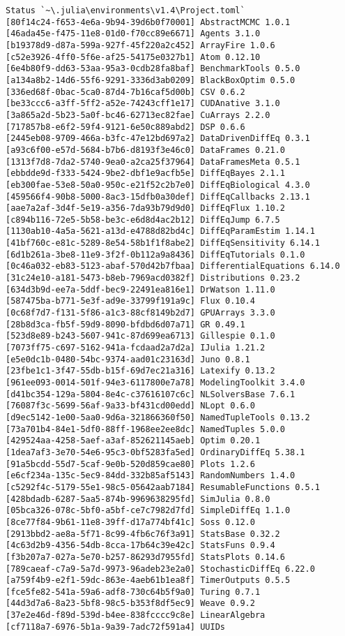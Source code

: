 \documentclass[12pt,a4paper]{article}
\begin{document}
\begin{verbatim}
Status `~\.julia\environments\v1.4\Project.toml`
[80f14c24-f653-4e6a-9b94-39d6b0f70001] AbstractMCMC 1.0.1
[46ada45e-f475-11e8-01d0-f70cc89e6671] Agents 3.1.0
[b19378d9-d87a-599a-927f-45f220a2c452] ArrayFire 1.0.6
[c52e3926-4ff0-5f6e-af25-54175e0327b1] Atom 0.12.10
[6e4b80f9-dd63-53aa-95a3-0cdb28fa8baf] BenchmarkTools 0.5.0
[a134a8b2-14d6-55f6-9291-3336d3ab0209] BlackBoxOptim 0.5.0
[336ed68f-0bac-5ca0-87d4-7b16caf5d00b] CSV 0.6.2
[be33ccc6-a3ff-5ff2-a52e-74243cff1e17] CUDAnative 3.1.0
[3a865a2d-5b23-5a0f-bc46-62713ec82fae] CuArrays 2.2.0
[717857b8-e6f2-59f4-9121-6e50c889abd2] DSP 0.6.6
[2445eb08-9709-466a-b3fc-47e12bd697a2] DataDrivenDiffEq 0.3.1
[a93c6f00-e57d-5684-b7b6-d8193f3e46c0] DataFrames 0.21.0
[1313f7d8-7da2-5740-9ea0-a2ca25f37964] DataFramesMeta 0.5.1
[ebbdde9d-f333-5424-9be2-dbf1e9acfb5e] DiffEqBayes 2.1.1
[eb300fae-53e8-50a0-950c-e21f52c2b7e0] DiffEqBiological 4.3.0
[459566f4-90b8-5000-8ac3-15dfb0a30def] DiffEqCallbacks 2.13.1
[aae7a2af-3d4f-5e19-a356-7da93b79d9d0] DiffEqFlux 1.10.2
[c894b116-72e5-5b58-be3c-e6d8d4ac2b12] DiffEqJump 6.7.5
[1130ab10-4a5a-5621-a13d-e4788d82bd4c] DiffEqParamEstim 1.14.1
[41bf760c-e81c-5289-8e54-58b1f1f8abe2] DiffEqSensitivity 6.14.1
[6d1b261a-3be8-11e9-3f2f-0b112a9a8436] DiffEqTutorials 0.1.0
[0c46a032-eb83-5123-abaf-570d42b7fbaa] DifferentialEquations 6.14.0
[31c24e10-a181-5473-b8eb-7969acd0382f] Distributions 0.23.2
[634d3b9d-ee7a-5ddf-bec9-22491ea816e1] DrWatson 1.11.0
[587475ba-b771-5e3f-ad9e-33799f191a9c] Flux 0.10.4
[0c68f7d7-f131-5f86-a1c3-88cf8149b2d7] GPUArrays 3.3.0
[28b8d3ca-fb5f-59d9-8090-bfdbd6d07a71] GR 0.49.1
[523d8e89-b243-5607-941c-87d699ea6713] Gillespie 0.1.0
[7073ff75-c697-5162-941a-fcdaad2a7d2a] IJulia 1.21.2
[e5e0dc1b-0480-54bc-9374-aad01c23163d] Juno 0.8.1
[23fbe1c1-3f47-55db-b15f-69d7ec21a316] Latexify 0.13.2
[961ee093-0014-501f-94e3-6117800e7a78] ModelingToolkit 3.4.0
[d41bc354-129a-5804-8e4c-c37616107c6c] NLSolversBase 7.6.1
[76087f3c-5699-56af-9a33-bf431cd00edd] NLopt 0.6.0
[d9ec5142-1e00-5aa0-9d6a-321866360f50] NamedTupleTools 0.13.2
[73a701b4-84e1-5df0-88ff-1968ee2ee8dc] NamedTuples 5.0.0
[429524aa-4258-5aef-a3af-852621145aeb] Optim 0.20.1
[1dea7af3-3e70-54e6-95c3-0bf5283fa5ed] OrdinaryDiffEq 5.38.1
[91a5bcdd-55d7-5caf-9e0b-520d859cae80] Plots 1.2.6
[e6cf234a-135c-5ec9-84dd-332b85af5143] RandomNumbers 1.4.0
[c5292f4c-5179-55e1-98c5-05642aab7184] ResumableFunctions 0.5.1
[428bdadb-6287-5aa5-874b-9969638295fd] SimJulia 0.8.0
[05bca326-078c-5bf0-a5bf-ce7c7982d7fd] SimpleDiffEq 1.1.0
[8ce77f84-9b61-11e8-39ff-d17a774bf41c] Soss 0.12.0
[2913bbd2-ae8a-5f71-8c99-4fb6c76f3a91] StatsBase 0.32.2
[4c63d2b9-4356-54db-8cca-17b64c39e42c] StatsFuns 0.9.4
[f3b207a7-027a-5e70-b257-86293d7955fd] StatsPlots 0.14.6
[789caeaf-c7a9-5a7d-9973-96adeb23e2a0] StochasticDiffEq 6.22.0
[a759f4b9-e2f1-59dc-863e-4aeb61b1ea8f] TimerOutputs 0.5.5
[fce5fe82-541a-59a6-adf8-730c64b5f9a0] Turing 0.7.1
[44d3d7a6-8a23-5bf8-98c5-b353f8df5ec9] Weave 0.9.2
[37e2e46d-f89d-539d-b4ee-838fcccc9c8e] LinearAlgebra
[cf7118a7-6976-5b1a-9a39-7adc72f591a4] UUIDs
\end{verbatim}
\end{document}
